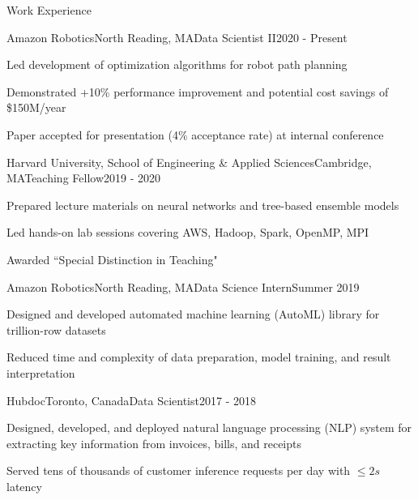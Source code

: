\documentclass{resume} %
\begin{document}
\begin{rSection}{Work Experience}

\begin{rSubsection}{Amazon Robotics}{North Reading, MA}{Data Scientist II}{2020 - Present}
	\item Led development of optimization algorithms for robot path planning
	\item Demonstrated +10\% performance improvement and potential cost savings of \$150M/year
	\item Paper accepted for presentation (4\% acceptance rate) at internal conference 
\end{rSubsection}
\begin{rSubsection}{Harvard University, School of Engineering \& Applied Sciences}{Cambridge, MA}{Teaching Fellow}{2019 - 2020}
	\item Prepared lecture materials on neural networks and tree-based ensemble models
	\item Led hands-on lab sessions covering AWS, Hadoop, Spark, OpenMP, MPI
	\item Awarded ``Special Distinction in Teaching"
\end{rSubsection}
\begin{rSubsection}{Amazon Robotics}{North Reading, MA}{Data Science Intern}{Summer 2019}
	\item Designed and developed automated machine learning (AutoML) library for trillion-row datasets
	\item Reduced time and complexity of data preparation, model training, and result interpretation
\end{rSubsection}
\begin{rSubsection}{Hubdoc}{Toronto, Canada}{Data Scientist}{2017 - 2018}
	\item Designed, developed, and deployed natural language processing (NLP) system for extracting key information from invoices, bills, and receipts
	\item Served tens of thousands of customer inference requests per day with $\leq 2s$  latency
\end{rSubsection}

\end{rSection}
\end{document}
